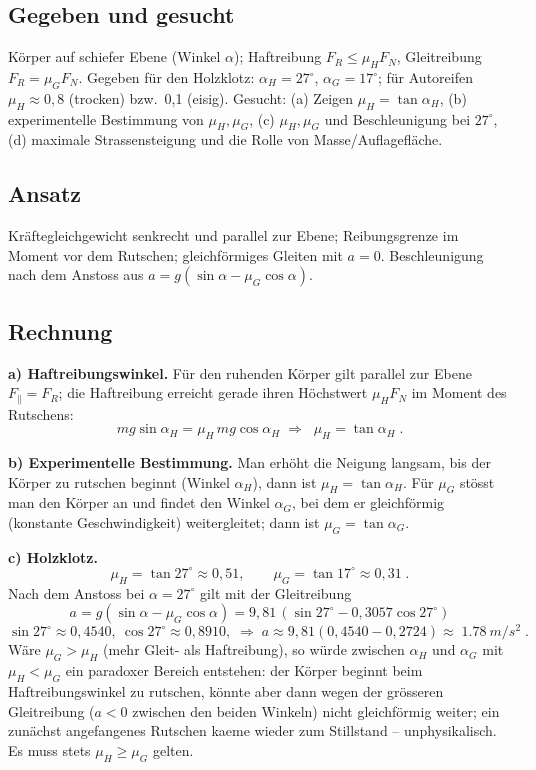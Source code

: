 
\subsection*{Gegeben und gesucht}
K\"orper auf schiefer Ebene (Winkel $\alpha$); Haftreibung
$F_R\le\mu_H F_N$, Gleitreibung $F_R=\mu_G F_N$. Gegeben für den Holzklotz:
$\alpha_H=27^\circ$, $\alpha_G=17^\circ$; f\"ur Autoreifen $\mu_H\approx0,8$
(trocken) bzw.\ 0,1 (eisig). Gesucht: (a) Zeigen $\mu_H=\tan\alpha_H$,
(b) experimentelle Bestimmung von $\mu_H,\mu_G$, (c) $\mu_H,\mu_G$ und
Beschleunigung bei $27^\circ$, (d) maximale Strassensteigung und die Rolle
von Masse/Auflagefläche.

\subsection*{Ansatz}
Kräftegleichgewicht senkrecht und parallel zur Ebene; Reibungsgrenze im
Moment vor dem Rutschen; gleichförmiges Gleiten mit $a=0$.
Beschleunigung nach dem Anstoss aus $a=g(\sin\alpha-\mu_G\cos\alpha)$.

\subsection*{Rechnung}
\textbf{a) Haftreibungswinkel.} Für den ruhenden Körper gilt parallel
zur Ebene $F_\parallel=F_R$; die Haftreibung erreicht gerade ihren
Höchstwert $\mu_H F_N$ im Moment des Rutschens:
\begin{equation}
  mg\sin\alpha_H=\mu_H\,mg\cos\alpha_H
  \;\Rightarrow\;
  \boxed{\;\mu_H=\tan\alpha_H\;}.
\end{equation}

\textbf{b) Experimentelle Bestimmung.} Man erhöht die Neigung langsam,
bis der Körper zu rutschen beginnt (Winkel $\alpha_H$), dann ist
$\mu_H=\tan\alpha_H$. Für $\mu_G$ stösst man den Körper an und findet
den Winkel $\alpha_G$, bei dem er gleichförmig (konstante Geschwindigkeit)
weitergleitet; dann ist $\mu_G=\tan\alpha_G$.

\textbf{c) Holzklotz.}
\begin{equation}
  \mu_H=\tan27^\circ\approx0{,}51,\qquad
  \mu_G=\tan17^\circ\approx0{,}31\;.
\end{equation}
Nach dem Anstoss bei $\alpha=27^\circ$ gilt mit der Gleitreibung
\begin{equation}
  a=g(\sin\alpha-\mu_G\cos\alpha)
  =9{,}81\,(\sin27^\circ-0{,}3057\cos27^\circ)
\end{equation}
\begin{equation}
  \sin27^\circ\approx0{,}4540,\ \cos27^\circ\approx0{,}8910,
  \;\Rightarrow\;
  a\approx9{,}81(0{,}4540-0{,}2724)\approx
  \boxed{\;\qty{1.78}{m/s^2}\;}.
\end{equation}
W\"are $\mu_G>\mu_H$ (mehr Gleit- als Haftreibung), so würde zwischen
$\alpha_H$ und $\alpha_G$ mit $\mu_H<\mu_G$ ein paradoxer Bereich
entstehen: der Körper beginnt beim Haftreibungswinkel zu rutschen, könnte
aber dann wegen der grösseren Gleitreibung ($a<0$ zwischen den beiden
Winkeln) nicht gleichförmig weiter; ein zunächst angefangenes Rutschen
kaeme wieder zum Stillstand -- unphysikalisch. Es muss stets
$\mu_H\ge\mu_G$ gelten.

